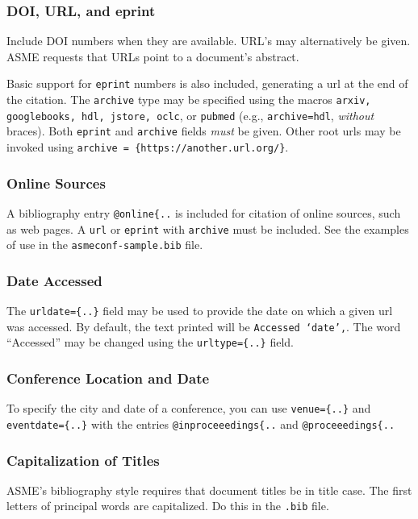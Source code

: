 \documentclass[colorlinks,upint,subscriptcorrection,varvw,hyphenate,balance,greek,russian,vietnamese,german]{asmeconf} %
\begin{document}
\subsubsection*{DOI, URL, and eprint} Include DOI numbers when they are available.  URL's may alternatively be given. ASME requests that URLs point to a document's abstract.

Basic support for \texttt{eprint} numbers is also included, generating a url at the end of the citation. The \texttt{archive} type may be specified using the macros \texttt{arxiv, google\-books, hdl, jstore, oclc}, or \texttt{pubmed} (e.g., \texttt{archive=hdl},  \emph{without} braces). Both \texttt{eprint} and \texttt{archive} fields \emph{must} be given. Other root urls may be invoked using \verb|archive = {https://another.url.org/}|.

\subsubsection*{Online Sources} A bibliography entry \verb|@online{..| is included for citation of online sources, such as web pages. A \texttt{url} or \texttt{eprint} with \texttt{archive} must be included. See the examples of use in the \texttt{asmeconf-sample.bib} file. 

\subsubsection*{Date Accessed} The \verb|urldate={..}| field may be used to provide the date on which a given url was accessed. By default, the text printed will be \texttt{Accessed `date',}. The word ``Accessed'' may be changed using the \verb|urltype={..}| field.

\subsubsection*{Conference Location and Date} To specify the city and date of a conference, you can use \verb|venue={..}| and \verb|eventdate={..}| with the entries \verb|@inproceeedings{..| and \verb|@proceeedings{..|

\subsubsection*{Capitalization of Titles} ASME's bibliography style requires that document titles be in title case. The first letters of principal words are capitalized. Do this in the \texttt{.bib} file.
\end{document}
